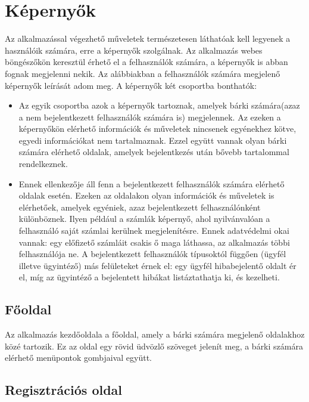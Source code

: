 \documentclass[centeredchapter]{thesis-ekf}
\theoremstyle{definition}
\theoremstyle{remark}
\begin{document}
\section{Képernyők}

Az alkalmazással végezhető műveletek természetesen láthatóak kell legyenek a használóik számára, erre a képernyők szolgálnak. Az alkalmazás webes böngészőkön keresztül érhető el a felhasználók számára, a képernyők is abban fognak megjelenni nekik. Az alábbiakban a felhasználók számára megjelenő képernyők leírását adom meg.
A képernyők két csoportba bonthatók:
 
 \begin{itemize}
 	\item Az egyik csoportba azok a képernyők tartoznak, amelyek bárki számára(azaz a nem bejelentkezett felhasználók számára is) megjelennek. Az ezeken a képernyőkön elérhető információk és műveletek nincsenek egyénekhez kötve, egyedi információkat nem tartalmaznak. Ezzel együtt vannak olyan bárki számára elérhető oldalak, amelyek bejelentkezés után bővebb tartalommal rendelkeznek.
 	\item Ennek ellenkezője áll fenn a bejelentkezett felhasználók számára elérhető oldalak esetén. Ezeken az oldalakon olyan információk és műveletek is elérhetőek, amelyek egyéniek, azaz bejelentkezett felhasználónként különböznek. Ilyen például a számlák képernyő, ahol nyilvánvalóan a felhasználó saját számlai kerülnek megjelenítésre. Ennek adatvédelmi okai vannak: egy előfizető számláit csakis ő maga láthassa, az alkalmazás többi felhasználója ne.
 	A bejelentkezett felhasználók típusoktól függően (ügyfél illetve ügyintéző) más felületeket érnek el: egy ügyfél hibabejelentő oldalt ér el, míg az ügyintéző a bejelentett hibákat listáztathatja ki, és kezelheti.
 \end{itemize}
  

\subsection{Főoldal}\hypertarget{leiras-fooldal}{}

Az alkalmazás kezdőoldala a főoldal, amely a bárki számára megjelenő oldalakhoz közé tartozik. Ez az oldal egy rövid üdvözlő szöveget jelenít meg, a bárki számára elérhető menüpontok gombjaival együtt.

\subsection{Regisztrációs oldal}\hypertarget{leiras-regisztracios}{}
\end{document}
